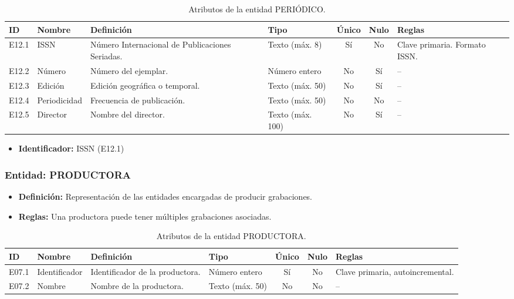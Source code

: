 	\begin{table}[H]
		\centering
		\caption{Atributos de la entidad PERIÓDICO.}
		\label{tab:dict_periodico}
		\small
		\begin{tabularx}{\textwidth}{l l X l c c X}
			\toprule
			\textbf{ID} & \textbf{Nombre} & \textbf{Definición} & \textbf{Tipo} & \textbf{Único} & \textbf{Nulo} & \textbf{Reglas} \\
			\midrule
			E12.1 & ISSN & Número Internacional de Publicaciones Seriadas. & Texto (máx. 8) & Sí & No & Clave primaria. Formato ISSN. \\
			\addlinespace
			E12.2 & Número & Número del ejemplar. & Número entero & No & Sí & -- \\
			\addlinespace
			E12.3 & Edición & Edición geográfica o temporal. & Texto (máx. 50) & No & Sí & -- \\
			\addlinespace
			E12.4 & Periodicidad & Frecuencia de publicación. & Texto (máx. 50) & No & No & -- \\
			\addlinespace
			E12.5 & Director & Nombre del director. & Texto (máx. 100) & No & Sí & -- \\
			\bottomrule
		\end{tabularx}
	\end{table}
	
	\begin{itemize}
		\item\textbf{Identificador:} ISSN (E12.1)
	\end{itemize}
	
	\subsubsection{Entidad: PRODUCTORA}
	\begin{itemize}
		\item\textbf{Definición:} Representación de las entidades encargadas de producir grabaciones.
		\item\textbf{Reglas:} Una productora puede tener múltiples grabaciones asociadas.
	\end{itemize}
	
	\begin{table}[H]
		\centering
		\caption{Atributos de la entidad PRODUCTORA.}
		\label{tab:dict_productora}
		\small
		\begin{tabularx}{\textwidth}{l l X l c c X}
			\toprule
			\textbf{ID} & \textbf{Nombre} & \textbf{Definición} & \textbf{Tipo} & \textbf{Único} & \textbf{Nulo} & \textbf{Reglas} \\
			\midrule
			E07.1 & Identificador & Identificador de la productora. & Número entero & Sí & No & Clave primaria, autoincremental. \\
			\addlinespace
			E07.2 & Nombre & Nombre de la productora. & Texto (máx. 50) & No & No & -- \\
			\bottomrule
		\end{tabularx}
	\end{table}
	
